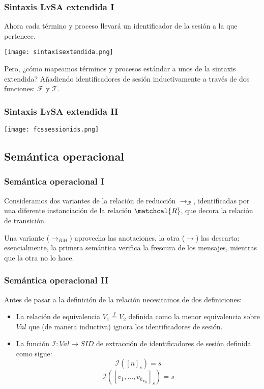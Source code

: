 \documentclass{beamer}
\begin{document}
\begin{frame}
    \frametitle{Sintaxis L\textsc{y}S\textsc{A} extendida I}
    \pause
    Ahora cada término y proceso llevará un identificador de la sesión a la que pertenece. 
    \pause[2]
    \begin{center}
    \texttt{[image: sintaxisextendida.png]}
    \end{center}
    \pause[3]
    Pero, ¿cómo mapeamos términos y procesos estándar a unos de la sintaxis extendida? \pause[4] Añadiendo identificadores de sesión inductivamente a través de dos funciones: $\mathcal{F}$ y $\mathcal{T}$.
\end{frame}

\begin{frame}
    \frametitle{Sintaxis L\textsc{y}S\textsc{A} extendida II}
    \pause
    \begin{center}
    \texttt{[image: fcssessionids.png]}
    \end{center}
\end{frame}

\subsection{Semántica operacional}

\begin{frame}
    \frametitle{Semántica operacional I}
    \pause
    Consideramos dos variantes de la relación de reducción $\rightarrow_\mathcal{R}$, identificadas por una diferente instanciación de la relación $\matchcal{R}$, que decora la relación de transición. 
    \pause[2]
    \vspace{1cm}
    
    Una variante ($\rightarrow_{RM}$) aprovecha las anotaciones, la otra ($\rightarrow$) las descarta: esencialmente, la primera semántica verifica la frescura de los mensajes, mientras que la otra no lo hace.
\end{frame}

\begin{frame}
    \frametitle{Semántica operacional II}
    \pause
    Antes de pasar a la definición de la relación necesitamos de dos definiciones:
    \pause[2]
    \begin{itemize}
        \item La relación de equivalencia $V_1 \overset{f}{=} V_2$ definida como la menor equivalencia sobre $Val$ que (de manera inductiva) ignora los identificadores de sesión.
        \item La función $\mathcal{I}: Val \rightarrow SID$ de extracción de identificadores de sesión definida como sigue:
            $$\mathcal{I}([n]_s) = s$$
            $$\mathcal{I}([{v_1, \dots, v_k}_{v_0}]_s) = s$$
    \end{itemize}
\end{frame}
\end{document}
